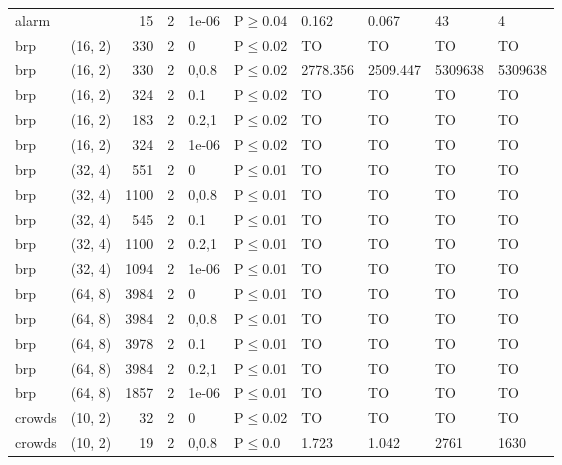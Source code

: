 \begin{longtable}{llrrllllll}
 alarm         &           &     	15 &   2 & 1e-06 & P$\geq$0.04  & 0.162    & 0.067    & 43      & 4       \\
 brp           & (16, 2)   &    	330 &   2 & 0     & P$\leq$0.02  & TO       & TO       & TO      & TO      \\
 brp           & (16, 2)   &    	330 &   2 & 0,0.8 & P$\leq$0.02  & 2778.356 & 2509.447 & 5309638 & 5309638 \\
 brp           & (16, 2)   &    	324 &   2 & 0.1   & P$\leq$0.02  & TO       & TO       & TO      & TO      \\
 brp           & (16, 2)   &    	183 &   2 & 0.2,1 & P$\leq$0.02  & TO       & TO       & TO      & TO      \\
 brp           & (16, 2)   &    	324 &   2 & 1e-06 & P$\leq$0.02  & TO       & TO       & TO      & TO      \\
 brp           & (32, 4)   &    	551 &   2 & 0     & P$\leq$0.01  & TO       & TO       & TO      & TO      \\
 brp           & (32, 4)   &   	1100 &   2 & 0,0.8 & P$\leq$0.01  & TO       & TO       & TO      & TO      \\
 brp           & (32, 4)   &    	545 &   2 & 0.1   & P$\leq$0.01  & TO       & TO       & TO      & TO      \\
 brp           & (32, 4)   &   	1100 &   2 & 0.2,1 & P$\leq$0.01  & TO       & TO       & TO      & TO      \\
 brp           & (32, 4)   &   	1094 &   2 & 1e-06 & P$\leq$0.01  & TO       & TO       & TO      & TO      \\
 brp           & (64, 8)   &   	3984 &   2 & 0     & P$\leq$0.01  & TO       & TO       & TO      & TO      \\
 brp           & (64, 8)   &   	3984 &   2 & 0,0.8 & P$\leq$0.01  & TO       & TO       & TO      & TO      \\
 brp           & (64, 8)   &   	3978 &   2 & 0.1   & P$\leq$0.01  & TO       & TO       & TO      & TO      \\
 brp           & (64, 8)   &   	3984 &   2 & 0.2,1 & P$\leq$0.01  & TO       & TO       & TO      & TO      \\
 brp           & (64, 8)   &   	1857 &   2 & 1e-06 & P$\leq$0.01  & TO       & TO       & TO      & TO      \\
 crowds        & (10, 2)   &     	32 &   2 & 0     & P$\leq$0.02  & TO       & TO       & TO      & TO      \\
 crowds        & (10, 2)   &     	19 &   2 & 0,0.8 & P$\leq$0.0   & 1.723    & 1.042    & 2761    & 1630    \\

\end{longtable}
